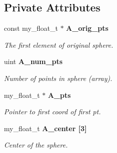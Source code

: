 \subsection*{Private Attributes}
\begin{CompactItemize}
\item 
const my\_\-float\_\-t $\ast$ \bf{A\_\-orig\_\-pts}\label{classSimSite3D_1_1DiscreteSphere_84eda7819366feacab69b8eca58b90a5}

\begin{CompactList}\small\item\em The first element of original sphere. \item\end{CompactList}\item 
uint \bf{A\_\-num\_\-pts}\label{classSimSite3D_1_1DiscreteSphere_75720a63fc626c586eab6e8e8342f00b}

\begin{CompactList}\small\item\em Number of points in sphere (array). \item\end{CompactList}\item 
my\_\-float\_\-t $\ast$ \bf{A\_\-pts}\label{classSimSite3D_1_1DiscreteSphere_6fa35750d9d3be1543df6e5fe88efa66}

\begin{CompactList}\small\item\em Pointer to first coord of first pt. \item\end{CompactList}\item 
my\_\-float\_\-t \bf{A\_\-center} [3]\label{classSimSite3D_1_1DiscreteSphere_c38903731c1e07ab1b6a72aba830abfb}

\begin{CompactList}\small\item\em Center of the sphere. \item\end{CompactList}\end{CompactItemize}
